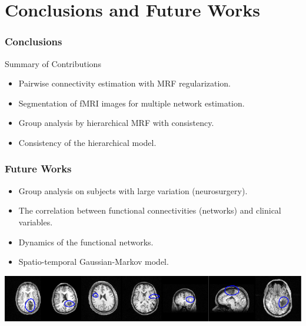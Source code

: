 \documentclass[sansserif, 10pt]{beamer}
\begin{document}
\section{Conclusions and Future Works}
\begin{frame}
  \frametitle{Conclusions}
  \begin{block}{Summary of Contributions}
    \begin{itemize}
    \item Pairwise connectivity estimation with MRF regularization.
    \item Segmentation of fMRI images for multiple network estimation. 
    \item Group analysis by hierarchical MRF with consistency. 
    \item Consistency of the hierarchical model. 
    \end{itemize}
  \end{block}
\end{frame}

\begin{frame}
  \frametitle{Future Works}
  \begin{block}{}
    \begin{itemize}
    \item Group analysis on subjects with large variation (neurosurgery).
    \item The correlation between functional connectivities (networks) and
      clinical variables.
    \item Dynamics of the functional networks.
    \item Spatio-temporal Gaussian-Markov model.
      \end{itemize}
  \end{block}
  \vspace{10pt}
  \includegraphics[width=1\textwidth]{sfig/allsurgery}
\end{frame}
\end{document}
